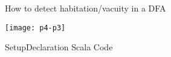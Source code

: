 
{  %
\begin{frame}{ How to detect habitation/vacuity in a DFA}

  \centering
  \texttt{[image: p4-p3]}
\end{frame}
}

\newsavebox\demoAbox
\begin{lrbox}{\demoAbox}
  \begin{minipage}{8cm}
    
  \end{minipage}
\end{lrbox}

\newsavebox\demoBbox
\begin{lrbox}{\demoBbox}
  \begin{minipage}{8cm}
    
  \end{minipage}
\end{lrbox}

\newsavebox\demoCbox
\begin{lrbox}{\demoCbox}
  \begin{minipage}{8cm}
    
  \end{minipage}
\end{lrbox}



\begin{frame}{Setup}{Declaration Scala Code}
  \begin{columns}
    \begin{column}{0.5\textwidth}
      \usebox\demoBbox
    \end{column}
    \begin{column}{0.5\textwidth}
    \end{column}
  \end{columns}
\end{frame}

